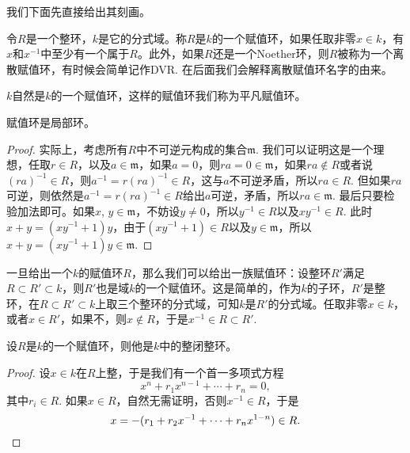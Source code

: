 
我们下面先直接给出其刻画。

\begin{para}[赋值环]
令$R$是一个整环，$k$是它的分式域。称$R$是$k$的一个赋值环，如果任取非零$x\in k$，有$x$和$x^{-1}$中至少有一个属于$R$。此外，如果$R$还是一个Noether环，则$R$被称为一个离散赋值环，有时候会简单记作DVR. 在后面我们会解释离散赋值环名字的由来。
\end{para}

$k$自然是$k$的一个赋值环，这样的赋值环我们称为平凡赋值环。

\begin{pro}
	赋值环是局部环。	
\end{pro}

\begin{proof} 
	实际上，考虑所有$R$中不可逆元构成的集合$\mathfrak{m}$. 我们可以证明这是一个理想，任取$r\in R$，以及$a\in\mathfrak{m}$，如果$a=0$，则$ra=0\in \mathfrak{m}$，如果$ra\not\in R$或者说$(ra)^{-1}\in R$，则$a^{-1}=r(ra)^{-1}\in R$，这与$a$不可逆矛盾，所以$ra\in R$. 但如果$ra$可逆，则依然是$a^{-1}=r(ra)^{-1}\in R$给出$a$可逆，矛盾，所以$ra\in \mathfrak{m}$. 最后只要检验加法即可。如果$x$, $y\in\mathfrak{m}$，不妨设$y\neq 0$，所以$y^{-1}\in R$以及$xy^{-1}\in R$. 此时$x+y=(xy^{-1}+1)y$，由于$(xy^{-1}+1)\in R$以及$y\in\mathfrak{m}$，所以$x+y=(xy^{-1}+1)y\in \mathfrak{m}$.
\end{proof}

\begin{para}
	一旦给出一个$k$的赋值环$R$，那么我们可以给出一族赋值环：设整环$R'$满足$R\subset R'\subset k$，则$R'$也是域$k$的一个赋值环。这是简单的，作为$k$的子环，$R'$是整环，在$R\subset R'\subset k$上取三个整环的分式域，可知$k$是$R'$的分式域。任取非零$x\in k$，或者$x\in R'$，如果不，则$x\not\in R$，于是$x^{-1}\in R\subset R'$.
\end{para} 

\begin{pro}
设$R$是$k$的一个赋值环，则他是$k$中的整闭整环。
\end{pro}

\begin{proof}
	设$x\in k$在$R$上整，于是我们有一个首一多项式方程
	\[
		x^n+r_1x^{n-1}+\cdots+r_n=0,
	\]
	其中$r_i\in R$. 如果$x\in R$，自然无需证明，否则$x^{-1}\in R$，于是
	\[
		x=-(r_1+r_2x^{-1}+\cdots+r_n x^{1-n})\in R.\qedhere
	\]
\end{proof}

